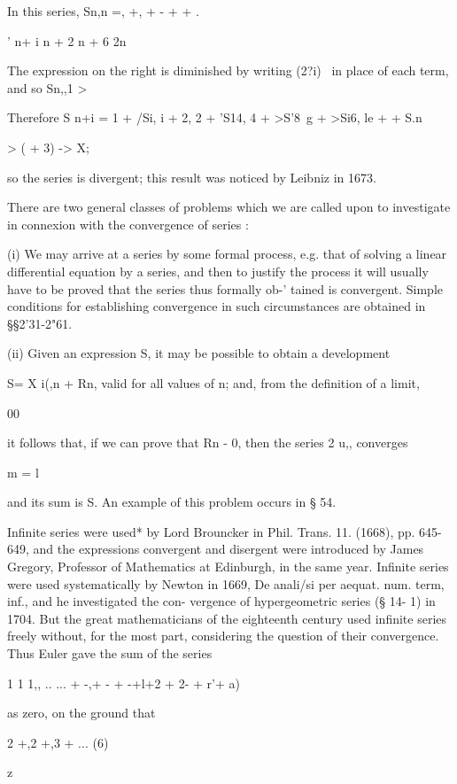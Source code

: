 In this series, Sn,n =, +, + - +  + .

' n+ i n + 2 n + 6 2n

The expression on the right is diminished by writing (2?i)~ in place
of each term, and so Sn,,1 >

%
%

Therefore S n+i = 1 + /Si, i + 2, 2 + 'S14, 4 + >S'8\ g + >Si6, le +
  + S.n

> ( + 3) -> X;

so the series is divergent; this result was noticed by Leibniz in
1673.

There are two general classes of problems which we are called upon to
investigate in connexion with the convergence of series :

(i) We may arrive at a series by some formal process, e.g. that of
solving a linear differential equation by a series, and then to
justify the process it will usually have to be proved that the series
thus formally ob-' tained is convergent. Simple conditions for
establishing convergence in such circumstances are obtained in
§§2'31-2"61.

(ii) Given an expression S, it may be possible to obtain a development

S= X i(,n + Rn, valid for all values of n; and, from the definition
of a limit,

00

it follows that, if we can prove that Rn - 0, then the series 2 u,,
converges

m = l

and its sum is S. An example of this problem occurs in § 54.

Infinite series were used* by Lord Brouncker in Phil. Trans. 11.
(1668), pp. 645-649, and the expressions convergent and disergent were
introduced by James Gregory, Professor of Mathematics at Edinburgh, in
the same year. Infinite series were used systematically by Newton in
1669, De anali/si per aequat. num. term, inf., and he investigated the
con- vergence of hypergeometric series (§ 14- 1) in 1704. But the
great mathematicians of the eighteenth century used infinite series
freely without, for the most part, considering the question of their
convergence. Thus Euler gave the sum of the series

1 1 1,, .. ... + -,+ - + -+l+2 + 2- + r'+ a)

as zero, on the ground that

2 +,2 +,3 + ... (6)

\-z

